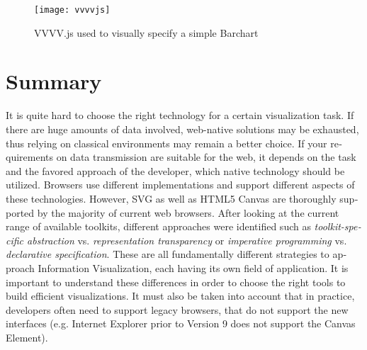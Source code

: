 \begin{english}
\begin{figure}
\centering
\texttt{[image: vvvvjs]}
\caption{VVVV.js used to visually specify a simple Barchart}
\label{fig:vvvvjs}
\end{figure}


\section{Summary}

It is quite hard to choose the right technology for a certain visualization task. If there are huge amounts of data involved, web-native solutions may be exhausted, thus relying on classical environments may remain a better choice. If your requirements on data transmission are suitable for the web, it depends on the task and the favored approach of the developer, which native technology should be utilized. Browsers use different implementations and support different aspects of these technologies. However, SVG as well as HTML5 Canvas are thoroughly supported by the majority of current web browsers. After looking at the current range of available toolkits, different approaches were identified such as \emph{toolkit-specific abstraction} vs. \emph{representation transparency} or \emph{imperative programming} vs. \emph{declarative specification}. These are all fundamentally different strategies to approach Information Visualization, each having its own field of application. It is important to understand these differences in order to choose the right tools to build efficient visualizations. It must also be taken into account that in practice, developers often need to support legacy browsers, that do not support the new interfaces (e.g. Internet Explorer prior to Version 9 does not support the Canvas Element).

\end{english}